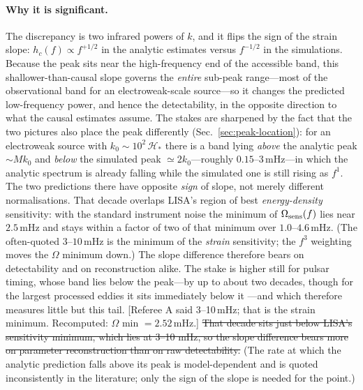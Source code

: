 \documentclass[10pt,prd,aps,nobibnotes,superscriptaddress,preprintnumbers,notitlepage]{revtex4-1}
\newcommand{\add}[1]{{\color{red}#1}}
\newcommand{\del}[1]{{\color{red}\sout{#1}}}
\newcommand{\why}[1]{{\color{red}\footnotesize\textsf{[#1]}}}
\newcommand{\add}[1]{#1}
\newcommand{\del}[1]{}
\newcommand{\why}[1]{}
\begin{document}
\paragraph{Why it is significant.} The discrepancy is two infrared powers of $k$, and it
flips the sign of the strain slope: $h_c(f)\propto f^{+1/2}$ in the analytic estimates versus
$f^{-1/2}$ in the simulations. Because the peak sits near the high-frequency end of the
accessible band, this shallower-than-causal slope governs the \emph{entire} sub-peak
range---most of the observational band for an electroweak-scale source---so it changes the
predicted low-frequency power, and hence the detectability, in the opposite direction to what
the causal estimates assume. The stakes are sharpened by the fact that the two pictures also
place the peak differently (Sec.~\ref{sec:peak-location}): for an electroweak source with
$k_0\sim10^2\,\mathcal H_\ast$ there is a band lying \emph{above} the analytic peak
$\sim Mk_0$ and \emph{below} the simulated peak $\simeq2k_0$---roughly
$0.15$--$3\,$mHz---in which the analytic spectrum is already falling while the simulated one
is still rising as $f^1$. The two predictions there have opposite \emph{sign} of slope, not
merely different normalisations. That decade \add{overlaps LISA's region of best
\emph{energy-density} sensitivity: with the standard instrument noise the minimum of
$\Omega_{\rm sens}(f)$ lies near $2.5\,$mHz and stays within a factor of two of that
minimum over $1.0$--$4.6\,$mHz. (The often-quoted $3$--$10\,$mHz is the minimum of the
\emph{strain} sensitivity; the $f^{3}$ weighting moves the $\Omega$ minimum down.) The
slope difference therefore bears on detectability and on reconstruction alike.} The
stake is higher still for pulsar timing, whose band lies below the peak---by up to about
two decades, though for the largest processed eddies it sits immediately below it
\cite{RoperPol:2022iel}---and which therefore measures little but this tail.
\why{Referee A said 3--10\,mHz; that is the strain minimum. Recomputed: $\Omega$ min
$=2.52\,$mHz.}
\del{That decade sits just below LISA's sensitivity minimum, which lies at 3--10 mHz, so
the slope difference bears more on parameter reconstruction than on raw detectability.} (The rate
at which the analytic prediction falls above its peak is model-dependent and is quoted
inconsistently in the literature; only the sign of the slope is needed for the point.)
\end{document}
